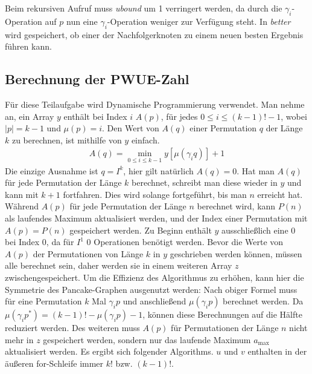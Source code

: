\documentclass[a4paper, 11pt, ngerman]{article}
\begin{document}
\noindent Beim rekursiven Aufruf muss \emph{ubound} um 1 verringert werden, da durch die $\gamma_i$-Operation auf $p$ nun eine $\gamma_i$-Operation weniger zur Verfügung steht. In \emph{better} wird gespeichert, ob einer der Nachfolgerknoten zu einem neuen besten Ergebnis führen kann.

\subsection{Berechnung der PWUE-Zahl}

Für diese Teilaufgabe wird Dynamische Programmierung verwendet. Man nehme an, ein Array $y$ enthält bei Index $i$ $A(p)$, für jedes $0 \le i \le (k - 1)! - 1$, wobei $|p| = k - 1$ und $\mu(p) = i$. Den Wert von $A(q)$ einer Permutation $q$ der Länge $k$ zu berechnen, ist mithilfe von $y$ einfach.
\begin{align*}
    A(q) = \min_{0 \le i \le k - 1}  y[\mu(\gamma_i q)] + 1
\end{align*}
Die einzige Ausnahme ist $q = I^k$, hier gilt natürlich $A(q) = 0$. Hat man $A(q)$ für jede Permutation der Länge $k$ berechnet, schreibt man diese wieder in $y$ und kann mit $k + 1$ fortfahren. Dies wird solange fortgeführt, bis man $n$ erreicht hat. Während $A(p)$ für jede Permutation der Länge $n$ berechnet wird, kann $P(n)$ als laufendes Maximum aktualisiert werden, und der Index einer Permutation mit $A(p) = P(n)$ gespeichert werden. Zu Beginn enthält $y$ ausschließlich eine 0 bei Index 0, da für $I^1$ 0 Operationen benötigt werden. Bevor die Werte von $A(p)$ der Permutationen von Länge $k$ in $y$ geschrieben werden können, müssen alle berechnet sein, daher werden sie in einem weiteren Array $z$ zwischengespeichert. Um die Effizienz des Algorithmus zu erhöhen, kann hier die Symmetrie des Pancake-Graphen ausgenutzt werden: Nach obiger Formel muss für eine Permutation $k$ Mal $\gamma_i p$ und anschließend $\mu(\gamma_i p)$ berechnet werden. Da $\mu(\gamma_i p^*) = (k - 1)! - \mu(\gamma_i p) - 1$, können diese Berechnungen auf die Hälfte reduziert werden. Des weiteren muss $A(p)$ für Permutationen der Länge $n$ nicht mehr in $z$ gespeichert werden, sondern nur das laufende Maximum $a_{\max}$ aktualisiert werden. Es ergibt sich folgender Algorithms. $u$ und $v$ enthalten in der äußeren for-Schleife immer $k!$ bzw. $(k - 1)!$.
\end{document}
